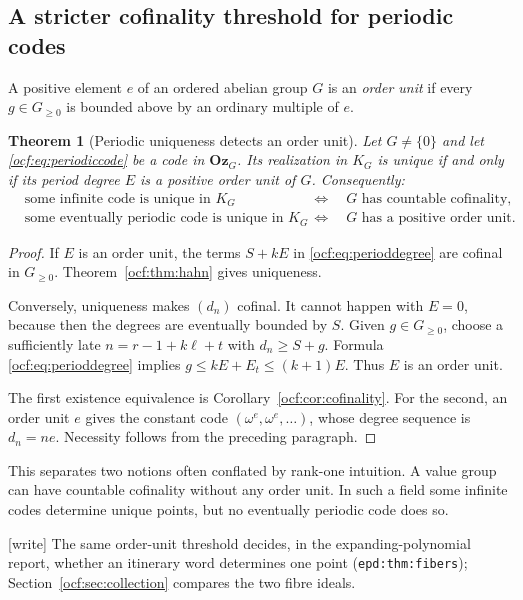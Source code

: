 \documentclass[11pt,a4paper]{article}
\numberwithin{equation}{section}
\newtheorem{theorem}{Theorem}[section]
\theoremstyle{definition}
\theoremstyle{remark}
\newcommand{\Oz}{\mathbf{Oz}}
\newcommand{\lbl}[1]{\nolinkurl{#1}}%
\newcommand{\wtag}{\textup{[write]}}%
\begin{document}
\subsection{A stricter cofinality threshold for periodic codes}

A positive element $e$ of an ordered abelian group $G$ is an \emph{order
unit} if every $g\in G_{\ge0}$ is bounded above by an ordinary multiple
of $e$.

\begin{theorem}[Periodic uniqueness detects an order unit]
\label{ocf:thm:orderunit}
Let $G\ne\{0\}$ and let \eqref{ocf:eq:periodiccode} be a code in $\Oz_G$.
Its realization in $K_G$ is unique if and only if its period degree $E$
is a positive order unit of $G$. Consequently:
\begin{align*}
 &\text{some infinite code is unique in }K_G
   &&\Longleftrightarrow\quad G\text{ has countable cofinality},\\
 &\text{some eventually periodic code is unique in }K_G
   &&\Longleftrightarrow\quad G\text{ has a positive order unit}.
\end{align*}
\end{theorem}
\begin{proof}
If $E$ is an order unit, the terms $S+kE$ in \eqref{ocf:eq:perioddegree} are
cofinal in $G_{\ge0}$. Theorem~\ref{ocf:thm:hahn} gives uniqueness.

Conversely, uniqueness makes $(d_n)$ cofinal. It cannot happen with
$E=0$, because then the degrees are eventually bounded by $S$. Given
$g\in G_{\ge0}$, choose a sufficiently late $n=r-1+k\ell+t$ with
$d_n\ge S+g$. Formula \eqref{ocf:eq:perioddegree} implies
$g\le kE+E_t\le(k+1)E$. Thus $E$ is an order unit.

The first existence equivalence is Corollary~\ref{ocf:cor:cofinality}. For the
second, an order unit $e$ gives the constant code
$(\omega^e,\omega^e,\ldots)$, whose degree sequence is $d_n=ne$.
Necessity follows from the preceding paragraph.
\end{proof}

This separates two notions often conflated by rank-one intuition. A value
group can have countable cofinality without any order unit. In such a
field some infinite codes determine unique points, but no eventually
periodic code does so.

\wtag{} The same order-unit threshold decides, in the expanding-polynomial
report, whether an itinerary word determines one point
(\lbl{epd:thm:fibers}); Section~\ref{ocf:sec:collection} compares the two
fibre ideals.
\end{document}
